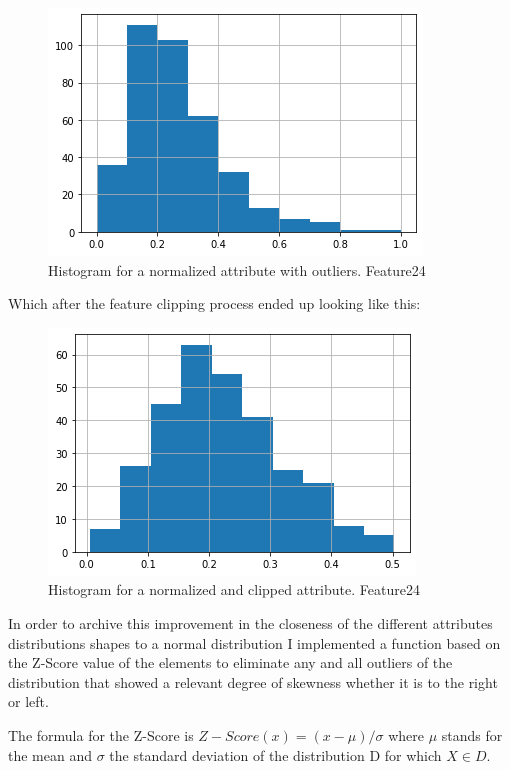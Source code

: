 \documentclass[12pt, a4paper]{article}
\begin{document}
	\begin{figure}[h]
		\label{Feature24N}
		\includegraphics{img/plots/feature24N.png}
		\caption{Histogram for a normalized attribute with outliers. Feature24}
	\end{figure}

	Which after the feature clipping process ended up looking like this:
	
	\begin{figure}[H]
		\label{Feature24NC}
		\includegraphics{img/plots/feature24NClip.png}
		\caption{Histogram for a normalized and clipped attribute. Feature24}
	\end{figure}

	In order to archive this improvement in the closeness of the different attributes distributions shapes to a normal distribution I implemented a function based on the Z-Score value of the elements to eliminate any and all outliers of the distribution that showed a relevant degree of skewness whether it is to the right or left.
	
	The formula for the Z-Score is $ Z-Score(x) = (x - \mu)/\sigma $ where $\mu$ stands for the mean and $\sigma$ the standard deviation of the distribution D for which $X \in D$.\cite{datascienceZscore}
	
	\vspace{5mm}
	
\end{document}
